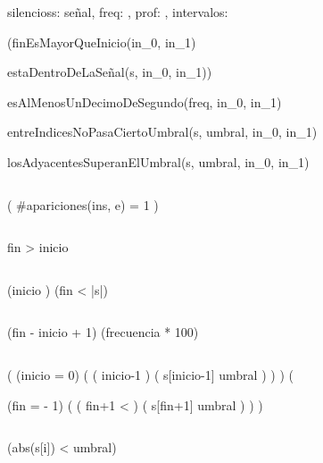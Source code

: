 \documentclass{article}
\begin{document}
\begin{proc}{silencios}{\In s: señal,
    \In freq: \ent,
    \In prof: \ent,
    \Out intervalos: }{}
\end{proc}

{

    \quad (finEsMayorQueInicio(in_{0}, in_{1}) \wedge

    \quad\quad estaDentroDeLaSeñal(s, in_{0}, in_{1})) \yLuego

    \quad\quad esAlMenosUnDecimoDeSegundo(freq, in_{0}, in_{1}) \wedge

    \quad\quad entreIndicesNoPasaCiertoUmbral(s, umbral, in_{0}, in_{1}) \wedge

    \quad\quad losAdyacentesSuperanElUmbral(s, umbral, in_{0}, in_{1})

}

$ $

{
    \implicaLuego (
        \#apariciones(ins, e) = 1
    )
}

$ $

{
    fin > inicio
}

$ $

{
    (inicio ) \wedge (fin < |s|)
}

$ $

{
    (fin - inicio + 1) \geq (frecuencia * 100)
}

$ $

{

    \quad(
        (inicio = 0) \vee (
            (
                inicio-1  
            ) \yLuego (
                s[inicio-1] \geq umbral
            )
        )
    ) \wedge (

        \quad\quad(fin =  - 1) \vee (
            (
                fin+1 < 
            ) \yLuego (
                s[fin+1] \geq umbral
            )
        )
    )

}

$ $

{

    \quad{}
    \implicaLuego
    (abs(s[i]) < umbral)

}
\end{document}

